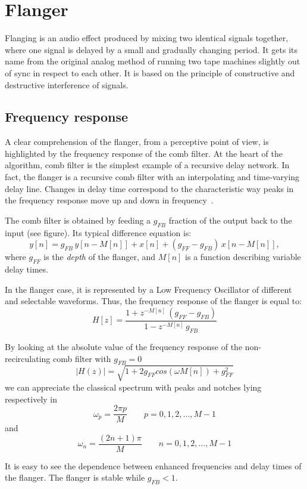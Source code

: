 \section{Flanger}
\label{sec:flanger}

Flanging is an audio effect produced by mixing two identical signals together, where one signal is delayed by a small and gradually changing period.
It gets its name from the original analog method of running two tape machines slightly out of sync in respect to each other.
It is based on the principle of constructive and destructive interference of signals.

\subsection{Frequency response}\label{sec:combfilt}

A clear comprehension of the flanger, from a perceptive point of view, is highlighted by the frequency response of the comb filter.
At the heart of the algorithm, comb filter is the simplest example of a recursive delay network.
In fact, the flanger is a recursive comb filter with an interpolating and time-varying delay line.
Changes in delay time correspond to the characteristic way peaks in the frequency response move up and down in frequency~\cite{puckette2006theory}.

The comb filter is obtained by feeding a $g_{FB}$ fraction of the output back to the input (see figure). Its typical difference equation is:
\[
y[n] = g_{FB} \, y[n - M[n]] + x[n] + (g_{FF} - g_{FB}) \, x[n - M[n]],
\]
where $g_{FF}$ is the \emph{depth} of the flanger, and $M[n]$ is a function describing variable delay times.

In the flanger case, it is represented by a Low Frequency Oscillator of different and selectable waveforms. Thus, the frequency response of the flanger is equal to:
\[
	H[z] = \frac{1 + z^{
			-M[n]} \, \left( g_{FF} - g_{FB} \right)
	}{
		1 - z^{-M[n]} \, g_{FB}
	}
\]

By looking at the absolute value of the frequency response of the non-recirculating comb filter with $g_{FB} = 0$
\[
|H(z)| = \sqrt{ 1 + 2g_{FF} cos(\omega M[n]) + g_{FF}^2}
\]
we can appreciate the classical spectrum with peaks and notches lying respectively in 
\[
\omega_p = \frac{2 \pi p}{M} \qquad  p = 0, 1, 2, \dots, M-1
\]
and 
\[
\omega_n = \frac{(2n+1) \pi}{M} \qquad n = 0, 1, 2, \dots, M-1
\]

It is easy to see the dependence between enhanced frequencies and delay times of the flanger. The flanger is stable while $g_{FB} < 1$.

